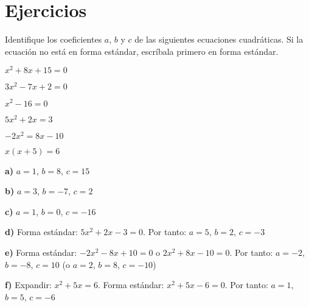 
\section{Ejercicios}

\begin{exercise}
\problem Identifique los coeficientes $a$, $b$ y $c$ de las siguientes ecuaciones cuadráticas. Si la ecuación no está en forma estándar, escríbala primero en forma estándar.

\begin{exerciselist}
    \item $x^2 + 8x + 15 = 0$
    \item $3x^2 - 7x + 2 = 0$
    \item $x^2 - 16 = 0$
    \item $5x^2 + 2x = 3$
    \item $-2x^2 = 8x - 10$
    \item $x(x + 5) = 6$
\end{exerciselist}

\begin{solucion}
\textbf{a)} $a = 1$, $b = 8$, $c = 15$

\textbf{b)} $a = 3$, $b = -7$, $c = 2$

\textbf{c)} $a = 1$, $b = 0$, $c = -16$

\textbf{d)} Forma estándar: $5x^2 + 2x - 3 = 0$. Por tanto: $a = 5$, $b = 2$, $c = -3$

\textbf{e)} Forma estándar: $-2x^2 - 8x + 10 = 0$ o $2x^2 + 8x - 10 = 0$. Por tanto: $a = -2$, $b = -8$, $c = 10$ (o $a = 2$, $b = 8$, $c = -10$)

\textbf{f)} Expandir: $x^2 + 5x = 6$. Forma estándar: $x^2 + 5x - 6 = 0$. Por tanto: $a = 1$, $b = 5$, $c = -6$
\end{solucion}
\end{exercise}


